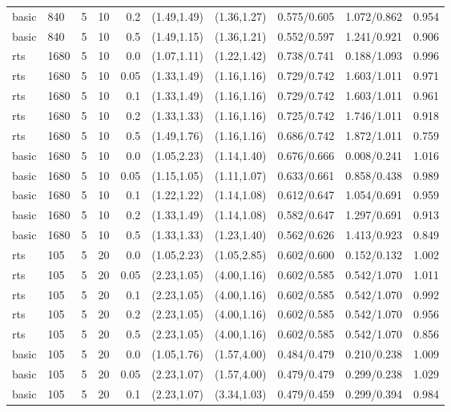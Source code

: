 \begin{tabular}{llrrrccccc}
basic & 840 & 5 & 10 & 0.2 & (1.49,1.49) & (1.36,1.27) & 0.575/0.605 & 1.072/0.862 & 0.954 \\
basic & 840 & 5 & 10 & 0.5 & (1.49,1.15) & (1.36,1.21) & 0.552/0.597 & 1.241/0.921 & 0.906 \\
rts & 1680 & 5 & 10 & 0.0 & (1.07,1.11) & (1.22,1.42) & 0.738/0.741 & 0.188/1.093 & 0.996 \\
rts & 1680 & 5 & 10 & 0.05 & (1.33,1.49) & (1.16,1.16) & 0.729/0.742 & 1.603/1.011 & 0.971 \\
rts & 1680 & 5 & 10 & 0.1 & (1.33,1.49) & (1.16,1.16) & 0.729/0.742 & 1.603/1.011 & 0.961 \\
rts & 1680 & 5 & 10 & 0.2 & (1.33,1.33) & (1.16,1.16) & 0.725/0.742 & 1.746/1.011 & 0.918 \\
rts & 1680 & 5 & 10 & 0.5 & (1.49,1.76) & (1.16,1.16) & 0.686/0.742 & 1.872/1.011 & 0.759 \\
basic & 1680 & 5 & 10 & 0.0 & (1.05,2.23) & (1.14,1.40) & 0.676/0.666 & 0.008/0.241 & 1.016 \\
basic & 1680 & 5 & 10 & 0.05 & (1.15,1.05) & (1.11,1.07) & 0.633/0.661 & 0.858/0.438 & 0.989 \\
basic & 1680 & 5 & 10 & 0.1 & (1.22,1.22) & (1.14,1.08) & 0.612/0.647 & 1.054/0.691 & 0.959 \\
basic & 1680 & 5 & 10 & 0.2 & (1.33,1.49) & (1.14,1.08) & 0.582/0.647 & 1.297/0.691 & 0.913 \\
basic & 1680 & 5 & 10 & 0.5 & (1.33,1.33) & (1.23,1.40) & 0.562/0.626 & 1.413/0.923 & 0.849 \\
rts & 105 & 5 & 20 & 0.0 & (1.05,2.23) & (1.05,2.85) & 0.602/0.600 & 0.152/0.132 & 1.002 \\
rts & 105 & 5 & 20 & 0.05 & (2.23,1.05) & (4.00,1.16) & 0.602/0.585 & 0.542/1.070 & 1.011 \\
rts & 105 & 5 & 20 & 0.1 & (2.23,1.05) & (4.00,1.16) & 0.602/0.585 & 0.542/1.070 & 0.992 \\
rts & 105 & 5 & 20 & 0.2 & (2.23,1.05) & (4.00,1.16) & 0.602/0.585 & 0.542/1.070 & 0.956 \\
rts & 105 & 5 & 20 & 0.5 & (2.23,1.05) & (4.00,1.16) & 0.602/0.585 & 0.542/1.070 & 0.856 \\
basic & 105 & 5 & 20 & 0.0 & (1.05,1.76) & (1.57,4.00) & 0.484/0.479 & 0.210/0.238 & 1.009 \\
basic & 105 & 5 & 20 & 0.05 & (2.23,1.07) & (1.57,4.00) & 0.479/0.479 & 0.299/0.238 & 1.029 \\
basic & 105 & 5 & 20 & 0.1 & (2.23,1.07) & (3.34,1.03) & 0.479/0.459 & 0.299/0.394 & 0.984 \\

\end{tabular}
